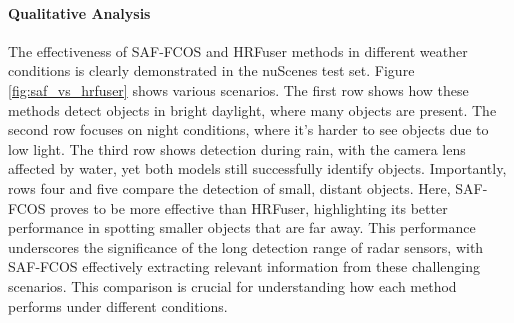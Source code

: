 \documentclass[report.tex]{subfiles}
\begin{document}
    \paragraph*{Qualitative Analysis}

    The effectiveness of SAF-FCOS and HRFuser methods in different weather conditions is clearly demonstrated in the nuScenes test set. Figure \ref{fig:saf_vs_hrfuser} shows various scenarios. The first row shows how these methods detect objects in bright daylight, where many objects are present. The second row focuses on night conditions, where it's harder to see objects due to low light. The third row shows detection during rain, with the camera lens affected by water, yet both models still successfully identify objects. Importantly, rows four and five compare the detection of small, distant objects. Here, SAF-FCOS proves to be more effective than HRFuser, highlighting its better performance in spotting smaller objects that are far away. This performance underscores the significance of the long detection range of radar sensors, with SAF-FCOS effectively extracting relevant information from these challenging scenarios. This comparison is crucial for understanding how each method performs under different conditions.
\end{document}
